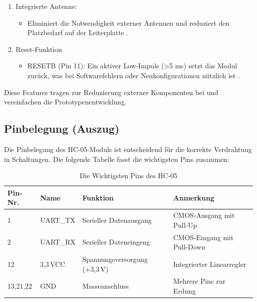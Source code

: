 \begin{enumerate}
	\item Integrierte Antenne:
	\begin{itemize}
		\item Eliminiert die Notwendigkeit externer Antennen und reduziert den Platzbedarf auf der Leiterplatte \cite{HC05Datasheet:2010}.
	\end{itemize}
	\item Reset-Funktion
	\begin{itemize}
		\item RESETB (Pin 11): Ein aktiver Low-Impuls (>5 ms) setzt das Modul zurück, was bei Softwarefehlern oder Neukonfigurationen nützlich ist \cite{HC05Datasheet:2010}.
	\end{itemize}
\end{enumerate}
Diese Features tragen zur Reduzierung externer Komponenten bei und vereinfachen die Prototypenentwicklung.



\subsection{Pinbelegung (Auszug)}
	
	Die Pinbelegung des HC-05-Moduls ist entscheidend für die korrekte Verdrahtung in Schaltungen. Die folgende Tabelle fasst die wichtigsten Pins zusammen:
	
\begin{table}[h]
	\centering
	\caption{Die Wichtigsten Pins des HC-05}
	\begin{tabular}{|l|l|l|l|}
		\hline
		\textbf{Pin-Nr.} & \textbf{Name} & \textbf{Funktion} 			 & 		\textbf{Anmerkung}	   \\ \hline
			 1	 		 & 	UART\_TX 	 & Serieller Datenausgang   	 &  CMOS-Ausgang mit Pull-Up   \\ \hline
			 2		 	 &	UART\_RX	 & Serieller Dateneingeng		 &  CMOS-Eingang mit Pull-Down \\ \hline
			12   		 &	3,3\,VCC     & Spannungsversorgung (+3,3\,V) &  Integrierter Linearregler  \\ \hline
		 13,21,22		 &	GND		     & Masseanschluss				 &  Mehrere Pins zur Erdung    \\ \hline

	\end{tabular}
	\label{tab:Pin Belegung}
\end{table}

